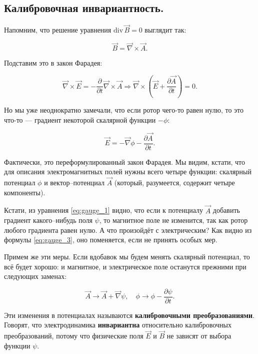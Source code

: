\documentclass[11pt,a4paper]{article}
\numberwithin{equation}{section}
\newcommand{\pt}{\partial}
\renewcommand{\div}{\mathrm{div}\,}
\newcommand{\vn}{\vec{\nabla}}
\begin{document}
\subsection{Калибровочная инвариантность.}
\label{gauge}

Напомним, что решение уравнения $\div \vec{B} = 0$ выглядит так: 

\begin{equation}
  \label{eq:gauge_1}
  \vec{B} = \vn \times \vec{A}.
\end{equation}

Подставим это в закон Фарадея:

\begin{equation}
  \label{eq:gauge_2}
  \vn \times \vec{E} = - \frac{\pt}{\pt t} \vn \times \vec{A}
  \Rightarrow \vn \times \left( \vec{E} + \frac{\pt \vec{A}}{\pt t}
  \right) = 0.
\end{equation}

Но мы уже неоднократно замечали, что если ротор чего-то равен нулю, то
это что-то --- градиент некоторой скалярной функции $-\phi$:

\begin{equation}
  \label{eq:gauge_3}
  \vec{E} = - \vn \phi - \frac{\pt \vec{A}}{\pt t}.
\end{equation}

Фактически, это переформулированный закон Фарадея. Мы видим, кстати,
что для описания электромагнитных полей нужны всего четыре функции:
скалярный потенциал $\phi$ и вектор--потенциал $\vec{A}$ (который,
разумеется, содержит четыре компоненты). 

Кстати, из уравнения \eqref{eq:gauge_1} видно, что если к потенциалу
$\vec{A}$ добавить градиент какого--нибудь поля $\psi$, то магнитное
поле не изменится, так как ротор любого градиента равен нулю. А что
произойдёт с электрическим? Как видно из формулы \eqref{eq:gauge_3},
оно поменяется, если не принять особых мер. 

Примем же эти меры. Если вдобавок мы будем менять скалярный потенциал,
то всё будет хорошо: и магнитное, и электрическое поле останутся
прежними при следующих заменах:

\begin{equation}
  \label{eq:gauge_transform}
  \vec{A} \to \vec{A} + \vn \psi, \quad \phi \to \phi - \frac{\pt
    \psi}{\pt t}.
\end{equation}

Эти изменения в потенциалах называются \textbf{калибровочными
  преобразованиями}. Говорят, что электродинамика \textbf{инвариантна}
относительно калибровочных преобразований, потому что физические поля
$\vec{E}$ и $\vec{B}$ не зависят от выбора функции $\psi$. 
\end{document}
